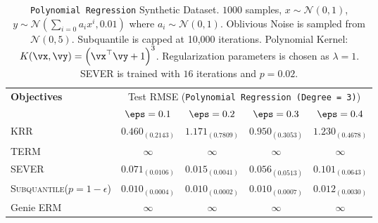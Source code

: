 \documentclass{article} %
\theoremstyle{plain}
\theoremstyle{definition}
\theoremstyle{remark}
\newcommand{\subhead}[1]{\multicolumn{1}{c}{#1}}%
\begin{document}
\begin{table}[!h]
	\centering
	\begin{tabular}{lcccc}
		\toprule 
		\textbf{Objectives}&\multicolumn{4}{c}{Test RMSE (\texttt{Polynomial Regression (Degree = 3)})}\\                   
		\cmidrule(rl){2-5}
		&\subhead{$\eps = 0.1$}& \subhead{$\eps = 0.2$}& \subhead{$\eps = 0.3$}& \subhead{$\eps=0.4$}\\ 
		\midrule
		KRR  &$0.460_{(0.2143)}$&$1.171_{(0.7809)}$&$0.950_{(0.3053)}$&$1.230_{(0.4678)}$\\
		TERM \citep{li:2021} &$\infty$&$\infty$&$\infty$&$\infty$\\
		SEVER \citep{diakonikolas:2019} &$0.071_{(0.0106)}$&$0.015_{(0.0041)}$&$0.056_{(0.0513)}$&$0.101_{(0.0643)}$\\
		\rowcolor{LightCyan}
		\textsc{Subquantile}($p = 1-\epsilon$) &$\mathbf{0.010_{(0.0004)}}$&$\mathbf{0.010_{(0.0002)}}$&$\mathbf{0.010_{(0.0007)}}$&$\mathbf{0.012_{(0.0030)}}$\\
		\midrule 
		Genie ERM &$\infty$&$\infty$&$\infty$&$\infty$\\
		\bottomrule
	\end{tabular}
	\caption{\texttt{Polynomial Regression} Synthetic Dataset. $1000$ samples, $x \sim \mathcal{N}(0,1)$, $y \sim \mathcal{N}(\sum_{i=0}a_ix^{i},0.01)$ where $a_i \sim \mathcal{N}(0,1)$. Oblivious Noise is sampled from $\mathcal{N}(0,5)$. Subquantile is capped at 10,000 iterations. Polynomial Kernel: $K(\vx,\vy) = \left(\vx^\top \vy + 1\right)^3$. Regularization parameters is chosen as $\lambda = 1$. SEVER is trained with $16$ iterations and $p = 0.02$. }
	\label{tab:polynomial-regression}
\end{table}
\end{document}
